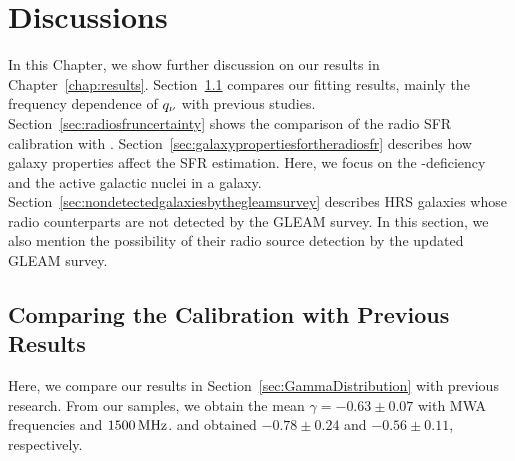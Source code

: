 \chapter{Discussions}\label{chap:discussions}
\begin{chapabstract}

In this Chapter, we show further discussion on our results in Chapter~\ref{chap:results}.
Section~\ref{sec:comparingthecalibration} compares our fitting results, mainly the frequency dependence of $q_{\nu}$ with previous studies.
Section~\ref{sec:radiosfruncertainty} shows the comparison of the radio SFR calibration with \citet{CalistroRivera2017a}.
Section~\ref{sec:galaxypropertiesfortheradiosfr} describes how galaxy properties affect the SFR estimation.
Here, we focus on the \nh-deficiency and the active galactic nuclei in a galaxy.
Section~\ref{sec:nondetectedgalaxiesbythegleamsurvey} describes HRS galaxies whose radio counterparts are not detected by the GLEAM survey.
In this section, we also mention the possibility of their radio source detection by the updated GLEAM survey.

\end{chapabstract}

\section{Comparing the Calibration with Previous Results}\label{sec:comparingthecalibration}

Here, we compare our results in Section~\ref{sec:GammaDistribution} with previous research.
From our samples, we obtain the mean $\gamma=-0.63 \pm 0.07$ with MWA frequencies and $1500\,\mathrm{MHz}$.
\citet{CalistroRivera2017a} and \citet{Chyzy2018} obtained $-0.78 \pm 0.24$ and $-0.56 \pm 0.11$, respectively.

